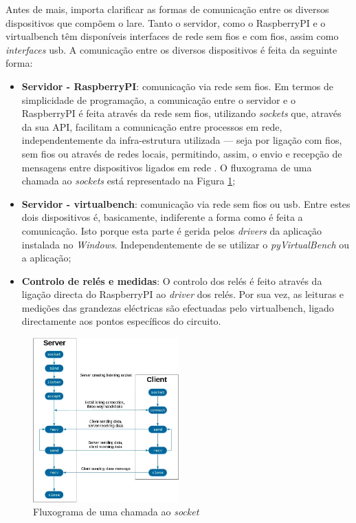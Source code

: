 Antes de mais, importa clarificar as formas de comunicação entre os diversos dispositivos que compõem o \acrshort{lare}. Tanto o servidor, como o \gls{RaspberryPI} e o \acrshort{virtualbench} têm disponíveis interfaces de rede sem fios e com fios, assim como \textit{interfaces} \acrshort{usb}. A comunicação entre os diversos dispositivos é feita da seguinte forma:
\begin{itemize}
    \item \textbf{Servidor - \gls{RaspberryPI}}: comunicação via rede sem fios. Em termos de simplicidade de programação, a comunicação entre o servidor e o \gls{RaspberryPI} é feita através da rede sem fios, utilizando \textit{sockets} que, através da sua API, facilitam a comunicação entre processos em rede, independentemente da infra-estrutura utilizada — seja por ligação com fios, sem fios ou através de redes locais, permitindo, assim, o envio e recepção de mensagens entre dispositivos ligados em rede \cite{Sockets}. O fluxograma de uma chamada ao \textit{sockets} está representado na Figura \ref{fig:fluxogramasockets};
    \item \textbf{Servidor - \acrshort{virtualbench}}: comunicação via rede sem fios ou \acrshort{usb}. Entre estes dois dispositivos é, basicamente, indiferente a forma como é feita a comunicação. Isto porque esta parte é gerida pelos \textit{drivers} da aplicação instalada no \textit{Windows}. Independentemente de se utilizar o \textit{pyVirtualBench} ou a aplicação;
    \item \textbf{Controlo de relés e medidas}: O controlo dos relés é feito através da ligação directa do \gls{RaspberryPI} ao \textit{driver} dos relés. Por sua vez, as leituras e medições das grandezas eléctricas são efectuadas pelo \acrshort{virtualbench}, ligado directamente aos pontos específicos do circuito.
\end{itemize}

\begin{figure}[hbtp]
    \centering
    \includegraphics[width=0.5\textwidth]{figures/socketsdiagrama.png}
    \caption{Fluxograma de uma chamada ao \textit{socket} \cite{Sockets}}
    \label{fig:fluxogramasockets}
\end{figure}

